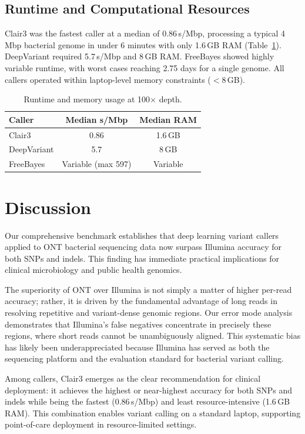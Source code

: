 \documentclass[11pt]{article}
\begin{document}
\subsection{Runtime and Computational Resources}

Clair3 was the fastest caller at a median of 0.86\,s/Mbp, processing a typical 4\,Mbp bacterial genome in under 6 minutes with only 1.6\,GB RAM (Table~\ref{tab:runtime}). DeepVariant required 5.7\,s/Mbp and 8\,GB RAM. FreeBayes showed highly variable runtime, with worst cases reaching 2.75 days for a single genome. All callers operated within laptop-level memory constraints ($<$8\,GB).

\begin{table}[h]
\centering
\caption{Runtime and memory usage at 100$\times$ depth.}
\label{tab:runtime}
\begin{tabular}{lcc}
\toprule
Caller & Median s/Mbp & Median RAM \\
\midrule
Clair3 & 0.86 & 1.6\,GB \\
DeepVariant & 5.7 & 8\,GB \\
FreeBayes & Variable (max 597) & Variable \\
\bottomrule
\end{tabular}
\end{table}

\section{Discussion}

Our comprehensive benchmark establishes that deep learning variant callers applied to ONT bacterial sequencing data now surpass Illumina accuracy for both SNPs and indels. This finding has immediate practical implications for clinical microbiology and public health genomics.

The superiority of ONT over Illumina is not simply a matter of higher per-read accuracy; rather, it is driven by the fundamental advantage of long reads in resolving repetitive and variant-dense genomic regions. Our error mode analysis demonstrates that Illumina's false negatives concentrate in precisely these regions, where short reads cannot be unambiguously aligned. This systematic bias has likely been underappreciated because Illumina has served as both the sequencing platform and the evaluation standard for bacterial variant calling.

Among callers, Clair3 emerges as the clear recommendation for clinical deployment: it achieves the highest or near-highest accuracy for both SNPs and indels while being the fastest (0.86\,s/Mbp) and least resource-intensive (1.6\,GB RAM). This combination enables variant calling on a standard laptop, supporting point-of-care deployment in resource-limited settings.
\end{document}
